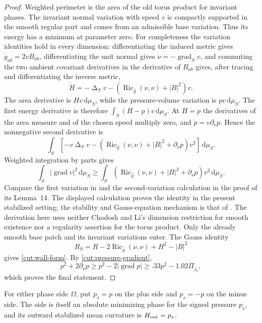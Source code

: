 \documentclass[11pt]{article}
\numberwithin{equation}{section}
\theoremstyle{definition}
\theoremstyle{remark}
\begin{document}
\begin{proof}
Weighted perimeter is the area of the old torus product for invariant
phases.  The invariant normal variation with speed $v$ is compactly
supported in the smooth regular part and comes from an admissible base
variation.  Thus its energy has a minimum at parameter zero.
For completeness the variation identities hold in every dimension:
differentiating the induced metric gives $\dot g_{ab}=2vB_{ab}$,
differentiating the unit normal gives $\dot\nu=-\operatorname{grad}_Sv$, and
commuting the two ambient covariant derivatives in the derivative of
$B_{ab}$ gives, after tracing and differentiating the inverse metric,
\[
 \dot H=-\operatorname{\Delta}_S v-(\operatorname{Ric}_{\widehat g}(\nu,\nu)+|B|^2)v.
\]
The area derivative is $Hv\,\mathrm d\mu_S$, while the pressure-volume
variation is $pv\,\mathrm d\mu_S$.  The first energy derivative is therefore
$\int_S(H-p)v\,\mathrm d\mu_S$.  At $H=p$ the derivatives of the area
measure and of the chosen speed multiply zero, and
$\dot p=v\partial_\nu p$.  Hence the nonnegative second derivative is
\[
 \int_S\left[-v\operatorname{\Delta}_Sv-
 (\operatorname{Ric}_{\widehat g}(\nu,\nu)+|B|^2+\partial_\nu p)v^2\right]
                         \,\mathrm d\mu_S.
\]
Weighted integration by parts gives
\[
 \int_S|\operatorname{grad} v|^2\,\mathrm d\mu_S
 \ge\int_S(\operatorname{Ric}_{\widehat g}(\nu,\nu)+|B|^2+
                           \partial_\nu p)v^2\,\mathrm d\mu_S.
\]
Compare the first variation in \citet[Lemma~13]{chodoshLi} and the
second-variation calculation in the proof of its Lemma~14. The displayed
calculation proves the identity in the present stabilized setting; the
stability and Gauss-equation mechanism is that of
\citet[Section~1]{schoenYau1979Structure}.
The derivation here uses neither Chodosh and Li's dimension restriction
for smooth existence nor a regularity assertion for the torus product.
Only the already smooth base patch and its invariant variations enter.
The Gauss identity
\[
 R_S=R-2\operatorname{Ric}_{\widehat g}(\nu,\nu)+H^2-|B|^2
\]
gives \eqref{cut:wall-form}.  By \eqref{cut:pressure-gradient},
\[
 p^2+2\partial_\nu p
       \ge p^2-2|\operatorname{grad} p|
       \ge .33p^2-1.02\Pi_{j_0},
\]
which proves the final statement.
\end{proof}

For either phase side $\Omega$, put $p_s=p$ on the plus side and
$p_s=-p$ on the minus side.  The side is itself an absolute minimizing
phase for the signed pressure $p_s$, and its outward stabilized mean
curvature is $H_{\rm out}=p_s$.
\end{document}
